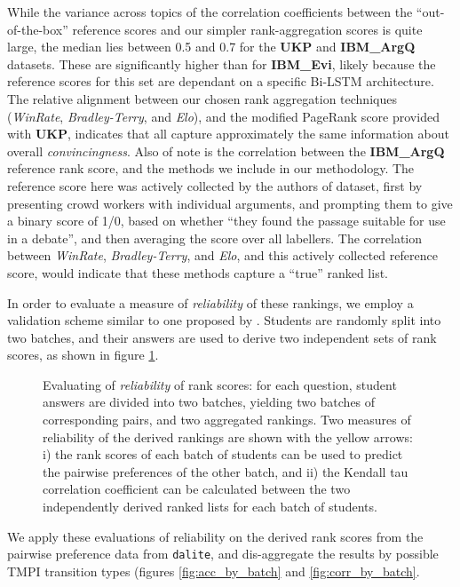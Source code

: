 \documentclass[notitlepage,12pt]{jedm}
\begin{document}
While the variance across topics of the correlation coefficients between the 
``out-of-the-box'' reference scores and our simpler rank-aggregation scores is 
quite large, the median lies between 0.5 and 0.7 for the \textbf{UKP} and 
\textbf{IBM\_ArgQ} datasets.
These are significantly higher than for \textbf{IBM\_Evi}, likely because the 
reference scores for this set are dependant on a specific Bi-LSTM architecture.
The relative alignment between our chosen rank aggregation techniques 
(\textit{WinRate}, \textit{Bradley-Terry}, and \textit{Elo}), and the modified 
PageRank score provided with \textbf{UKP}, indicates that all capture 
approximately the same information about overall \textit{convincingness}.
Also of note is the correlation between the \textbf{IBM\_ArgQ} reference rank 
score, and the methods we include in our methodology. 
The reference score here was actively collected by the authors of dataset, 
first by presenting crowd workers with individual arguments, and prompting them 
to give a binary score of 1/0, based on whether ``they found the passage 
suitable for use in a debate'', and then averaging the score over all labellers.
The correlation between \textit{WinRate}, \textit{Bradley-Terry}, and 
\textit{Elo}, and this actively collected reference score, would indicate that 
these methods capture a ``true'' ranked list.
   
In order to evaluate a measure of \textit{reliability} of these rankings, we 
employ a validation scheme similar to one proposed by \cite{jones_peer_2015}.
Students are randomly split into two batches, and their answers are used to 
derive two independent sets of rank scores, as shown in figure 
\ref{fig:evaluate_rankings}. 


\begin{figure}[H]
	\centering
	\scalebox{0.5}{}
	\caption{
		Evaluating of \textit{reliability} of rank scores: for each question, 
		student answers are divided into two batches, yielding two batches of 
		corresponding pairs, and two aggregated rankings.
		Two measures of reliability of the derived rankings are shown with the 
		yellow arrows: 
		i) the rank scores of each batch of students can be used to predict the 
		pairwise preferences of the other batch, and 
		ii) the Kendall tau correlation coefficient can be calculated between 
		the two independently derived ranked lists for each batch of students. 
	}
	\label{fig:evaluate_rankings}
\end{figure}

We apply these evaluations of reliability on the derived rank scores from the 
pairwise preference data from \verb|dalite|, and dis-aggregate the results by 
possible TMPI transition types (figures \ref{fig:acc_by_batch} and 
\ref{fig:corr_by_batch}.
\end{document}
